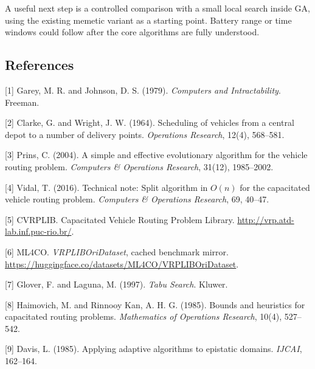 A useful next step is a controlled comparison with a small local search inside GA, using the
existing memetic variant as a starting point. Battery range or time windows could follow after
the core algorithms are fully understood.

\subsection*{References}
\begingroup\small\setlength{\parskip}{3pt}
[1] Garey, M. R. and Johnson, D. S. (1979). \emph{Computers and Intractability}. Freeman.

[2] Clarke, G. and Wright, J. W. (1964). Scheduling of vehicles from a central depot to a
number of delivery points. \emph{Operations Research}, 12(4), 568--581.

[3] Prins, C. (2004). A simple and effective evolutionary algorithm for the vehicle routing
problem. \emph{Computers \& Operations Research}, 31(12), 1985--2002.

[4] Vidal, T. (2016). Technical note: Split algorithm in $O(n)$ for the capacitated vehicle
routing problem. \emph{Computers \& Operations Research}, 69, 40--47.

[5] CVRPLIB. Capacitated Vehicle Routing Problem Library. \url{http://vrp.atd-lab.inf.puc-rio.br/}.

[6] ML4CO. \emph{VRPLIBOriDataset}, cached benchmark mirror.
\url{https://huggingface.co/datasets/ML4CO/VRPLIBOriDataset}.

[7] Glover, F. and Laguna, M. (1997). \emph{Tabu Search}. Kluwer.

[8] Haimovich, M. and Rinnooy Kan, A. H. G. (1985). Bounds and heuristics for capacitated
routing problems. \emph{Mathematics of Operations Research}, 10(4), 527--542.

[9] Davis, L. (1985). Applying adaptive algorithms to epistatic domains. \emph{IJCAI}, 162--164.
\endgroup
